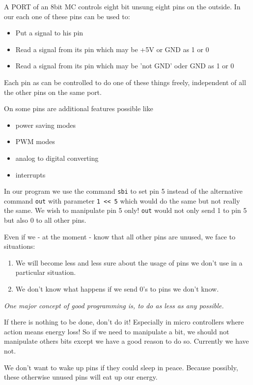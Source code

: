 A PORT of an 8bit MC controls eight bit unsung eight pins on the outside. In our \at each one of these pins can be used to:

\begin{itemize}
  \item Put a signal to his pin
  \item Read a signal from its pin which may be +5V or GND as 1 or 0
  \item Read a signal from its pin which may be 'not GND' oder GND as 1 or 0
\end{itemize}

Each pin as can be controlled to do one of these things freely, independent of all the other pins on the same port.

On some pins are additional features possible like

\begin{itemize}
  \item power saving modes
  \item PWM modes
  \item analog to digital converting
  \item interrupts
\end{itemize}

In our program we use the command \texttt{sbi} to set pin 5 instead of the alternative command \texttt{out} with parameter \texttt{1 << 5} which would do the same but not really the same. We wish to manipulate pin 5 only! \texttt{out} would not only send 1 to pin 5 but also 0 to all other pins.

Even if we - at the moment - know that all other pins are unused, we face to situations:

\begin{enumerate}
  \item We will become less and less sure about the usage of pins we don't use in a particular situation.
  \item We don't know what happens if we send 0's to pins we don't know.
\end{enumerate}

\emph{One major concept of good programming is, to do as less as any possible.}

If there is nothing to be done, don't do it! Especially in micro controllers where action means energy loss! So if we need to manipulate a bit, we should not manipulate others bits except we have a good reason to do so. Currently we have not.

We don't want to wake up pins if they could sleep in peace. Because possibly, these otherwise unused pins will eat up our energy.

